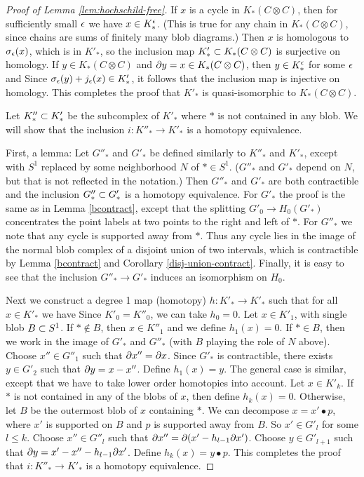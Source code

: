 \begin{proof}[Proof of Lemma \ref{lem:hochschild-free}]
If $x$ is a cycle in $K_*(C\otimes C)$, then for sufficiently small $\epsilon$ we have
$x \in K_*^\epsilon$.
(This is true for any chain in $K_*(C\otimes C)$, since chains are sums of
finitely many blob diagrams.)
Then $x$ is homologous to $\sigma_\epsilon(x)$, which is in $K'_*$, so the inclusion map
$K'_* \subset K_*(C\otimes C)$ is surjective on homology.
If $y \in K_*(C\otimes C)$ and $\partial y = x \in K_*(C\otimes C)$, then $y \in K_*^\epsilon$ for some $\epsilon$
and
Since $\sigma_\epsilon(y) + j_\epsilon(x) \in K'_*$, it follows that the inclusion map is injective on homology.
This completes the proof that $K'_*$ is quasi-isomorphic to $K_*(C\otimes C)$.

Let $K''_* \subset K'_*$ be the subcomplex of $K'_*$ where $*$ is not contained in any blob.
We will show that the inclusion $i: K''_* \to K'_*$ is a homotopy equivalence.

First, a lemma:  Let $G''_*$ and $G'_*$ be defined similarly to $K''_*$ and $K'_*$, except with
$S^1$ replaced by some neighborhood $N$ of $* \in S^1$.
($G''_*$ and $G'_*$ depend on $N$, but that is not reflected in the notation.)
Then $G''_*$ and $G'_*$ are both contractible
and the inclusion $G''_* \subset G'_*$ is a homotopy equivalence.
For $G'_*$ the proof is the same as in Lemma \ref{bcontract}, except that the splitting
$G'_0 \to H_0(G'_*)$ concentrates the point labels at two points to the right and left of $*$.
For $G''_*$ we note that any cycle is supported away from $*$.
Thus any cycle lies in the image of the normal blob complex of a disjoint union
of two intervals, which is contractible by Lemma \ref{bcontract} and Corollary \ref{disj-union-contract}.
Finally, it is easy to see that the inclusion
$G''_* \to G'_*$ induces an isomorphism on $H_0$.

Next we construct a degree 1 map (homotopy) $h: K'_* \to K'_*$ such that
for all $x \in K'_*$ we have
Since $K'_0 = K''_0$, we can take $h_0 = 0$.
Let $x \in K'_1$, with single blob $B \subset S^1$.
If $* \notin B$, then $x \in K''_1$ and we define $h_1(x) = 0$.
If $* \in B$, then we work in the image of $G'_*$ and $G''_*$ (with $B$ playing the role of $N$ above).
Choose $x'' \in G''_1$ such that $\partial x'' = \partial x$.
Since $G'_*$ is contractible, there exists $y \in G'_2$ such that $\partial y = x - x''$.
Define $h_1(x) = y$.
The general case is similar, except that we have to take lower order homotopies into account.
Let $x \in K'_k$.
If $*$ is not contained in any of the blobs of $x$, then define $h_k(x) = 0$.
Otherwise, let $B$ be the outermost blob of $x$ containing $*$.
We can decompose $x = x' \bullet p$, 
where $x'$ is supported on $B$ and $p$ is supported away from $B$.
So $x' \in G'_l$ for some $l \le k$.
Choose $x'' \in G''_l$ such that $\partial x'' = \partial (x' - h_{l-1}\partial x')$.
Choose $y \in G'_{l+1}$ such that $\partial y = x' - x'' - h_{l-1}\partial x'$.
Define $h_k(x) = y \bullet p$.
This completes the proof that $i: K''_* \to K'_*$ is a homotopy equivalence.


\end{proof}
